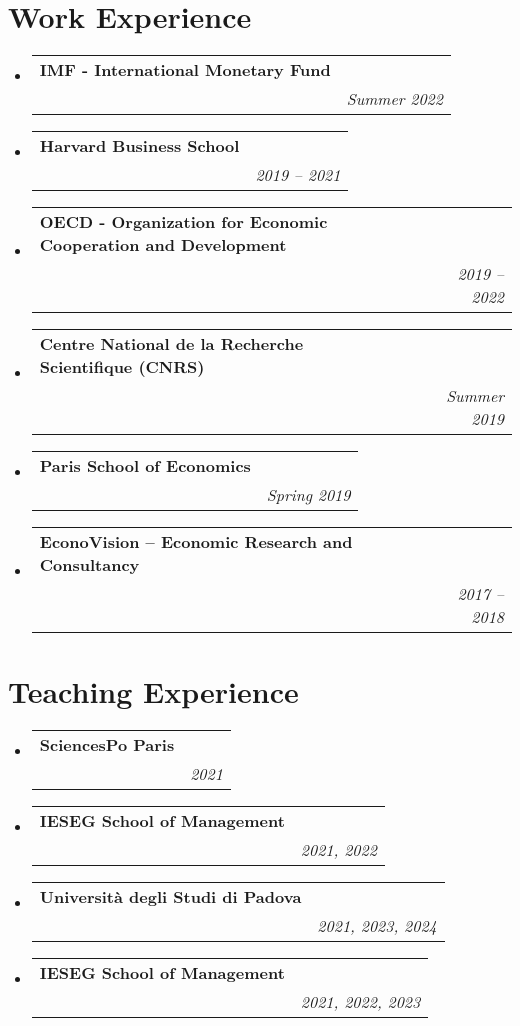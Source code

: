 \documentclass[letterpaper,11pt]{article}
\makeatletter
\newcommand{\resumeSubheading}[4]{
  \vspace{-2pt}\item
    \begin{tabular*}{0.97\textwidth}[t]{l@{\extracolsep{\fill}}r}
      \textbf{#1} & #2 \\
      \text{\small#3} & \textit{\small #4} \\
    \end{tabular*}\vspace{-7pt}
}
\newcommand{\resumeSubHeadingListStart}{\begin{itemize}[leftmargin=0.15in, label={}]}
\newcommand{\resumeSubHeadingListEnd}{\end{itemize}}
\makeatother
\begin{document}
{%
\section{Work Experience}
  \resumeSubHeadingListStart    
    \resumeSubheading
      {IMF - International Monetary Fund}{}
      {Fund Internship Program - Fiscal Affairs Department}{Summer 2022}  
    \resumeSubheading
      {Harvard Business School}{}
      {Research Assistant to Marco Tabellini}{2019 -- 2021}
    \resumeSubheading
      {OECD - Organization for Economic Cooperation and Development}{}
      {Consultant (PARIS21/Statistics and Data Directorate)}{2019 -- 2022}    \resumeSubheading
      {Centre National de la Recherche Scientifique (CNRS)}{}
      {Research Assistant to Jérémie Gignoux and Akiko Suwa-Eisenmann}{Summer 2019}   
      \resumeSubheading
      {Paris School of Economics}{}
      {Research Assistant to Claudia Senik}{Spring 2019}    
    \resumeSubheading
      {EconoVision – Economic Research and Consultancy}{}
      {Junior Consultant}{2017 -- 2018}
\resumeSubHeadingListEnd

\section{Teaching Experience}
  \resumeSubHeadingListStart
    \resumeSubheading
      {SciencesPo Paris}{}
      {Lecturer in Applied Econometrics using Stata, Graduate}{2021}   
     \resumeSubheading
      {IESEG School of Management}{}
      {Lecturer in Microeconomics, Undergraduate}{2021, 2022}      
       \resumeSubheading
      {Università degli Studi di Padova}{}
      {Guest Lecturer in Environmental Economics and Policy, Undergraduate (10h)}{2021, 2023, 2024}
     \resumeSubheading
      {IESEG School of Management}{}
      {Lecturer in Macroeconomics, Graduate}{2021, 2022, 2023}
         \resumeSubHeadingListEnd    
         
}
\end{document}
